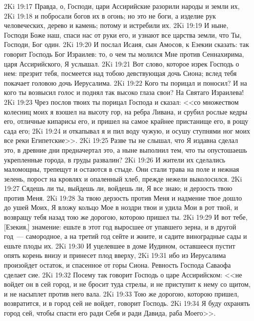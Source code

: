 \vs 2Ki 19:17 Правда, о, Господи, цари Ассирийские разорили народы и земли их,
\vs 2Ki 19:18 и побросали богов их в огонь; но это не боги, а изделие рук человеческих, дерево и камень; потому и истребили их.
\vs 2Ki 19:19 И ныне, Господи Боже наш, спаси нас от руки его, и узнают все царства земли, что Ты, Господи, Бог один.
\rsbpar\vs 2Ki 19:20 И послал Исаия, сын Амосов, к Езекии сказать: так говорит Господь Бог Израилев: то, о чем ты молился Мне против Сеннахирима, царя Ассирийского, Я услышал.
\vs 2Ki 19:21 Вот слово, которое изрек Господь о нем: презрит тебя, посмеется над тобою девствующая дочь Сиона; вслед тебя покачает головою дочь Иерусалима.
\vs 2Ki 19:22 Кого ты порицал и поносил? И на кого ты возвысил голос и поднял так высоко глаза свои? На Святаго Израилева!
\vs 2Ki 19:23 Чрез послов твоих ты порицал Господа и сказал: <<со множеством колесниц моих я взошел на высоту гор, на ребра Ливана, и срубил рослые кедры его, отличные кипарисы его, и пришел на самое крайнее пристанище его, в рощу сада его;
\vs 2Ki 19:24 и откапывал я и пил воду чужую, и осушу ступнями ног моих все реки Египетские>>.
\vs 2Ki 19:25 Разве ты не слышал, что Я издавна сделал это, в древние дни предначертал это, а ныне выполнил тем, что ты опустошаешь укрепленные города,  в груды развалин?
\vs 2Ki 19:26 И жители их сделались маломощны, трепещут и остаются в стыде. Они стали  трава на поле и нежная зелень,  порост на кровлях и опаленный хлеб, прежде нежели выколосился.
\vs 2Ki 19:27 Сядешь ли ты, выйдешь ли, войдешь ли, Я все знаю;  и дерзость твою против Меня.
\vs 2Ki 19:28 За твою дерзость против Меня и  надмение твое дошло до ушей Моих, Я вложу кольцо Мое в ноздри твои и удила Мои в рот твой, и возвращу тебя назад тою же дорогою, которою пришел ты.
\vs 2Ki 19:29 И вот тебе, [Езекия,] знамение: ешьте в этот год выросшее от упавшего зерна, и в другой год~--- самородное, а на третий год сейте и жните, и садите виноградные сады и ешьте плоды их.
\vs 2Ki 19:30 И уцелевшее в доме Иудином, оставшееся пустит опять корень внизу и принесет плод вверху,
\vs 2Ki 19:31 ибо из Иерусалима произойдет остаток, и спасенное от горы Сиона. Ревность Господа Саваофа сделает сие.
\vs 2Ki 19:32 Посему так говорит Господь о царе Ассирийском: <<не войдет он в сей город, и не бросит туда стрелы, и не приступит к нему со щитом, и не насыплет против него вала.
\vs 2Ki 19:33 Тою же дорогою, которою пришел, возвратится, и в город сей не войдет, говорит Господь.
\vs 2Ki 19:34 Я буду охранять город сей, чтобы спасти его ради Себя и ради Давида, раба Моего>>.
